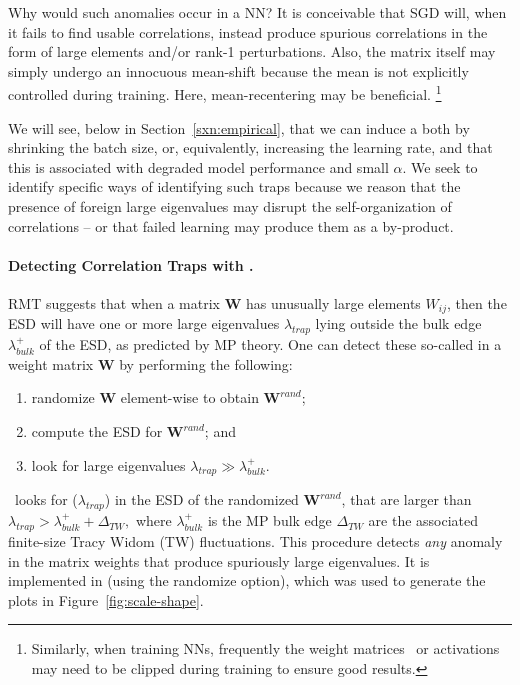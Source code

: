 Why would such anomalies  occur in a NN?
It is conceivable that SGD will, when it fails to find usable correlations, instead
produce spurious
correlations in the form of large elements and/or rank-1 perturbations.
Also, the matrix itself may simply undergo an innocuous  mean-shift because the
mean is not explicitly controlled during training. Here,  mean-recentering may be beneficial.
\footnote{Similarly, when training NNs, frequently the weight matrices~\cite{baskin2021} or activations~\cite{choi2018_TR}
may need to be clipped during training to ensure good results.}

We will see, below in Section~\ref{sxn:empirical}, that we can induce a \CorrelationTrap both by shrinking the batch 
size, or, equivalently, increasing the learning rate, and that this is associated with degraded model performance
and small $\alpha$.
We seek to identify specific ways of identifying such traps because we 
reason that the presence of foreign large eigenvalues may disrupt the self-organization of correlations – or that failed learning may produce them as a by-product.

\paragraph{Detecting Correlation Traps with \RMT.}

RMT suggests that when a matrix $\mathbf{W}$ has unusually large elements $W_{ij}$, then the ESD will have one or more large eigenvalues $\lambda_{trap}$ lying outside the bulk edge $\lambda^{+}_{bulk}$ of the ESD, as predicted by MP theory. 
One can detect these so-called \CorrelationTraps in a weight matrix $\mathbf{W}$ by performing the following:
\begin{enumerate}
\item randomize $\mathbf{W}$ element-wise to obtain $\mathbf{W}^{rand}$;
\item compute the ESD for $\mathbf{W}^{rand}$; and
\item look for large eigenvalues $\lambda_{trap}\gg\lambda^{+}_{bulk}$.
\end{enumerate}
\WW~looks for \CorrelationTraps ($\lambda_{trap}$) in the ESD of the randomized $\mathbf{W}^{rand}$, that are larger than 
$ \lambda_{trap}>\lambda_{bulk}^{+}+\Delta_{TW} , $ 
where 
$\lambda^{+}_{bulk}$ is the MP bulk edge $\Delta_{TW}$ are the associated finite-size Tracy Widom (TW) fluctuations. 
This procedure detects \emph{any} anomaly in the matrix weights that produce spuriously large eigenvalues. 
It is implemented in \WW (using the randomize option), which was used to generate the plots in Figure~\ref{fig:scale-shape}.

